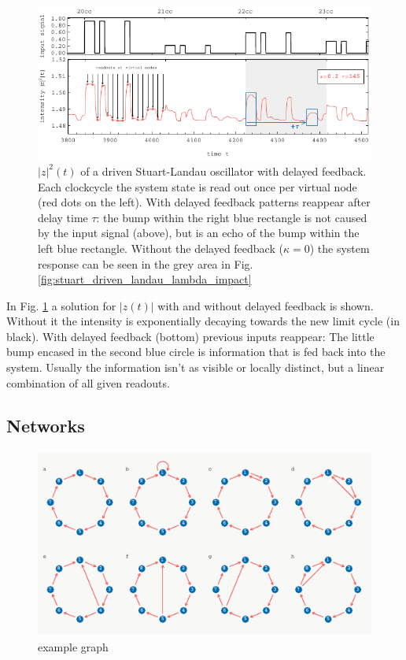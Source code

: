\begin{figure}
	\centering
	\includegraphics[width=15cm]{pics/driven_and_delayed}
	\caption{$|z|^{2}(t)$ of a driven Stuart-Landau oscillator with delayed feedback. Each clockcycle the system state is read out once per virtual node (red dots on the left). With delayed feedback patterns reappear after delay time $\tau$: the bump within the right blue rectangle is not caused by the input signal (above), but is an echo of the bump within the left blue rectangle. Without the delayed feedback ($\kappa=0$) the system response can be seen in the grey area in Fig.\ref{fig:stuart_driven_landau_lambda_impact}}
	\label{fig:driven_and_delayed}
\end{figure}

In Fig. \ref{fig:driven_and_delayed} a solution for $|z(t)|$ with and without delayed feedback is shown. Without it the intensity is exponentially decaying towards the new limit cycle (in black). With delayed feedback (bottom) previous inputs reappear: The little bump encased in the second blue circle is information that is fed back into the system. Usually the information isn't as visible or locally distinct, but a linear combination of all given readouts.



\subsection{Networks}

	\begin{figure}
		\centering
		\includegraphics[width=12cm]{pics/graph_plot}
		\caption{example graph}
		\label{fig:example_graph}
	\end{figure}

